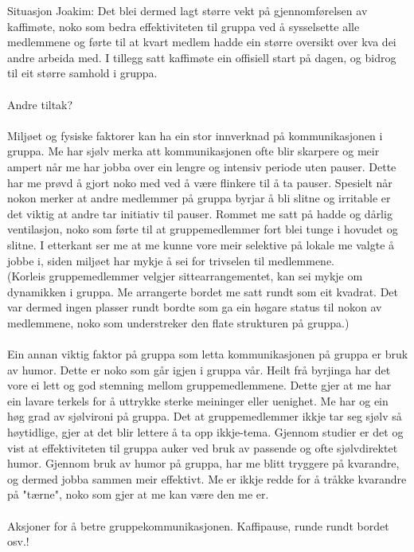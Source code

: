 Situasjon Joakim:
Det blei dermed lagt større vekt på gjennomførelsen av kaffimøte, noko som bedra effektiviteten til gruppa ved å sysselsette alle medlemmene og førte til at kvart medlem hadde ein større oversikt over kva dei andre arbeida med. I tillegg satt kaffimøte ein offisiell start på dagen, og bidrog til eit større samhold i gruppa. 
\\
\\
Andre tiltak?
\\
\\
Miljøet og fysiske faktorer kan ha ein stor innverknad på kommunikasjonen i gruppa. Me har sjølv merka att kommunikasjonen ofte blir skarpere og meir ampert når me har jobba over ein lengre og intensiv periode uten pauser. Dette har me prøvd å gjort noko med ved å være flinkere til å ta pauser. Spesielt når nokon merker at andre medlemmer på gruppa byrjar å bli slitne og irritable er det viktig at andre tar initiativ til pauser. 
Rommet me satt på hadde og dårlig ventilasjon, noko som førte til at gruppemedlemmer fort blei tunge i hovudet og slitne. I etterkant ser me at me kunne vore meir selektive på lokale me valgte å jobbe i, siden miljøet har mykje å sei for trivselen til medlemmene.
\\
(Korleis gruppemedlemmer velgjer sittearrangementet, kan sei mykje om dynamikken i gruppa. Me arrangerte bordet me satt rundt som eit kvadrat. Det var dermed ingen plasser rundt bordte som ga ein høgare status til nokon av medlemmene, noko som understreker den flate strukturen på gruppa.)
\\
\\
Ein annan viktig faktor på gruppa som letta kommunikasjonen på gruppa er bruk av humor. Dette er noko som går igjen i gruppa vår. Heilt frå byrjinga har det vore ei lett og god stemning mellom gruppemedlemmene. Dette gjer at me har ein lavare terkels for å uttrykke sterke meininger eller uenighet. Me har og ein høg grad av sjølvironi på gruppa. Det at gruppemedlemmer ikkje tar seg sjølv så høytidlige, gjer at det blir lettere å ta opp ikkje-tema. Gjennom studier er det og vist at effektiviteten til gruppa auker ved bruk av passende og ofte sjølvdirektet humor. Gjennom bruk av humor på gruppa, har me blitt tryggere på kvarandre, og dermed jobba sammen meir effektivt. Me er ikkje redde for å tråkke kvarandre på "tærne", noko som gjer at me kan være den me er. 
\\
\\
Aksjoner for å betre gruppekommunikasjonen. Kaffipause, runde rundt bordet osv.!
